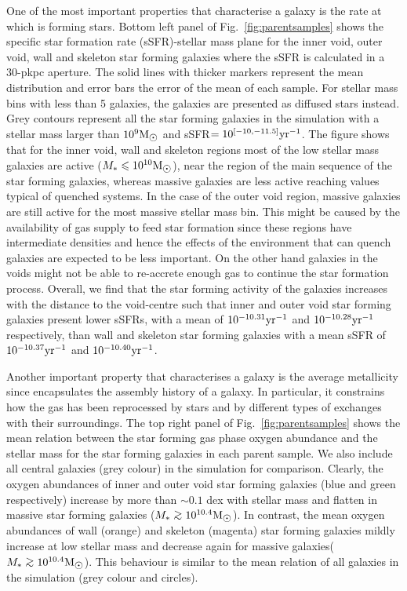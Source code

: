 \documentclass[a4paper,fleqn,usenatbib,letter]{mnras}
\newcommand{\Msun}{\rm M_{\sun}}
\newcommand{\gsim}{\mathrel{\hbox{\rlap{\lower.55ex\hbox{$\sim$}} \kern-.3em\raise.4ex\hbox{$>$}}}}
\begin{document}
 
 
One of the most important properties that characterise  a galaxy is the rate at which is forming stars.  Bottom left panel of Fig.~\ref{fig:parentsamples} shows the specific star formation rate (sSFR)-stellar mass plane for the inner void, outer void, wall and skeleton  star forming galaxies where the sSFR is calculated in a 30-pkpc aperture. The solid lines with thicker markers represent the mean distribution and error bars the error of the mean of each sample. For stellar mass bins with less than 5 galaxies, the galaxies are presented as diffused stars instead.  Grey contours represent all the star forming galaxies in the simulation with a stellar mass larger than $10^9\Msun$ and sSFR$=10^{[-10,-11.5]}\rm yr^{-1}$. The figure shows that for the inner void, wall and skeleton regions most of the low stellar mass galaxies are active ($M_{*}\leq10^{10}\Msun$), near the region of the main sequence of the star forming galaxies, whereas massive galaxies are less active reaching values typical of quenched systems. In the case of the outer void region, massive galaxies are still active for the most massive stellar mass bin. This might be caused by the availability of gas supply to feed star formation since these regions have intermediate densities and hence the effects of the environment that can quench galaxies are expected to be less important. On the other hand galaxies in the voids might not be able to re-accrete enough gas to continue the star formation process.  Overall, we find that the star forming activity of the galaxies increases with the distance to the void-centre such that  inner and outer  void star forming galaxies present lower sSFRs,  with a mean of $10^{-10.31}\rm yr^{-1}$ and $10^{-10.28} \rm yr^{-1}$ respectively, than wall and skeleton star forming galaxies with a mean sSFR of   $10^{-10.37} \rm yr^{-1}$ and $10^{-10.40} \rm yr^{-1}$. 


Another important property that characterises a galaxy is the average metallicity since encapsulates the assembly history of a galaxy.  In particular, it  constrains how the gas has been reprocessed by stars and by different types of exchanges with their surroundings. The top right panel of Fig.~\ref{fig:parentsamples} shows the mean relation between the star forming gas phase oxygen abundance and the stellar mass for the star forming galaxies in each parent sample. We also include all central galaxies (grey colour) in the simulation for comparison. Clearly, the oxygen abundances of inner and outer void star forming  galaxies (blue and green respectively) increase by more than $\sim 0.1$ dex with stellar mass and flatten in massive star forming galaxies ($M_{*}\gsim10^{10.4}\Msun$). In contrast, the mean oxygen abundances of  wall (orange) and skeleton (magenta) star forming galaxies mildly increase at low stellar mass and decrease again for massive galaxies($M_{*}\gsim10^{10.4}\Msun$).     This behaviour is similar to the mean relation of all galaxies in the simulation (grey colour and circles).  
\end{document}
